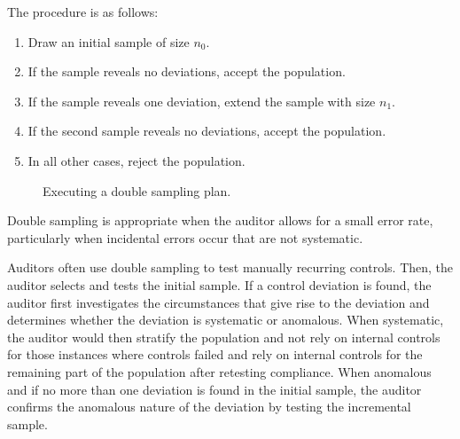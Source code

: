 \bigskip
The procedure is as follows:

\begin{enumerate}[leftmargin=*,labelsep=.5em]
	\item Draw an initial sample of size $n_0$.
	\item If the sample reveals no deviations, accept the population.
	\item If the sample reveals one deviation, extend the sample with size $n_1$.
	\item If the second sample reveals no deviations, accept the population.
	\item In all other cases, reject the population. 
\end{enumerate}

\begin{figure}
\caption{Executing a double sampling plan.}
\end{figure}

Double sampling is appropriate when the auditor allows for a small error rate, particularly when incidental errors occur that are not systematic.

\bigskip
Auditors often use double sampling to test manually recurring controls. Then, the auditor selects and tests the initial sample. If a control deviation is found, the auditor first investigates the circumstances that give rise to the deviation and determines whether the deviation is systematic or anomalous. When systematic, the auditor would then stratify the population and not rely on internal controls for those instances where controls failed and rely on internal controls for the remaining part of the population after retesting compliance. When anomalous and if no more than one deviation is found in the initial sample, the auditor confirms the anomalous nature of the deviation by testing the incremental sample.

